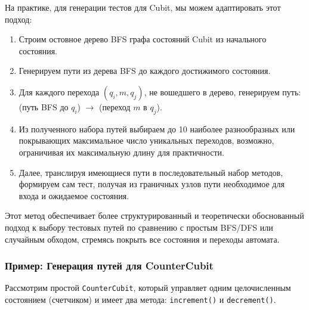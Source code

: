 \documentclass[14pt, russian]{scrartcl}
\begin{document}
На практике, для генерации тестов для Cubit, мы можем адаптировать этот подход:
\begin{enumerate}
    \item Строим остовное дерево BFS графа состояний Cubit из начального состояния.
    \item Генерируем пути из дерева BFS до каждого достижимого состояния.
    \item Для каждого перехода $(q_i, m, q_j)$, не вошедшего в дерево, генерируем путь: (путь BFS до $q_i$) $\rightarrow$ (переход $m$ в $q_j$).
    \item Из полученного набора путей выбираем до 10 наиболее разнообразных или покрывающих максимальное число уникальных переходов, возможно, ограничивая их максимальную длину для практичности.
    \item Далее, транслируя имеющиеся пути в последовательный набор методов, формируем сам тест, получая из граничных узлов пути необходимое для входа и ожидаемое состояния.
\end{enumerate}

Этот метод обеспечивает более структурированный и теоретически обоснованный подход к выбору тестовых путей по сравнению с простым BFS/DFS или случайным обходом, стремясь покрыть все состояния и переходы автомата.

\subsubsection{Пример: Генерация путей для CounterCubit}

Рассмотрим простой \texttt{CounterCubit}, который управляет одним целочисленным состоянием (счетчиком) и имеет два метода: \texttt{increment()} и \texttt{decrement()}.
\end{document}

